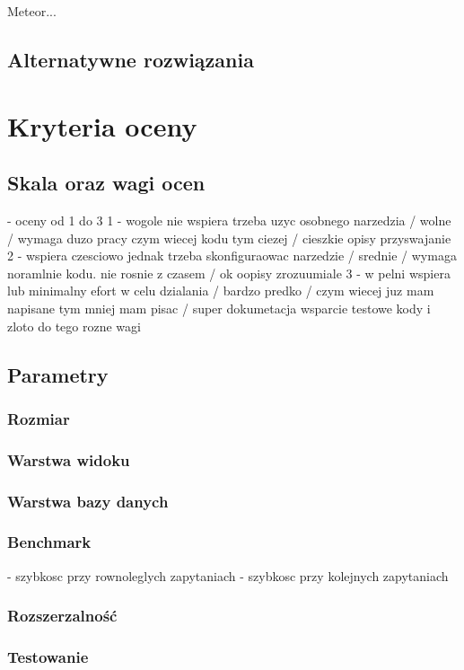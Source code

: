 \documentclass[12pt]{report}
\begin{document}
  \newline
  Meteor...
  
  \section{Alternatywne rozwiązania}



\chapter{Kryteria oceny}

  \section{Skala oraz wagi ocen}
  - oceny od 1 do 3 1 - wogole nie wspiera trzeba uzyc osobnego narzedzia / wolne / wymaga duzo pracy czym wiecej kodu tym ciezej / cieszkie opisy przyswajanie
  2 - wspiera czesciowo jednak trzeba skonfiguraowac narzedzie / srednie / wymaga noramlnie kodu. nie rosnie z czasem / ok oopisy zrozuumiale
  3 - w pelni wspiera lub minimalny efort w celu dzialania / bardzo predko / czym wiecej juz mam napisane tym mniej mam pisac / super dokumetacja wsparcie testowe kody i zloto
  do tego rozne wagi

  \section{Parametry}
  \subsection{Rozmiar}
  \subsection{Warstwa widoku}
  \subsection{Warstwa bazy danych}
  \subsection{Benchmark}
    - szybkosc przy rownoleglych zapytaniach
    - szybkosc przy kolejnych zapytaniach
  \subsection{Rozszerzalność}
  \subsection{Testowanie}
\end{document}
